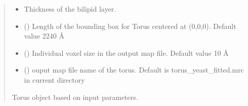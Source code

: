 \documentclass[letterpaper,10pt,english]{sphinxmanual}
\begin{document}
\begin{fulllineitems}
\begin{fulllineitems}
\begin{quote}
\begin{description}
\begin{itemize}
\item {} 
\sphinxAtStartPar
{} \textendash{} Thickness of the bilipid layer.

\item {} 
\sphinxAtStartPar
{} (\sphinxstyleliteralemphasis{\sphinxupquote{, }}) \textendash{} Length of the bounding box for Torus centered at (0,0,0). Default value 2240 Å

\item {} 
\sphinxAtStartPar
{} (\sphinxstyleliteralemphasis{\sphinxupquote{, }}) \textendash{} Individual voxel size in the output map file. Default value 10 Å

\item {} 
\sphinxAtStartPar
{} (\sphinxstyleliteralemphasis{\sphinxupquote{, }}) \textendash{} ouput map file name of the torus. Default is torus\_yeast\_fitted.mrc in current directory

\end{itemize}

\sphinxAtStartPar
Torus object based on input parameters.

\sphinxAtStartPar
{\hyperref[\detokenize{src:src.Torus.Torus}]{}}

\end{description}\end{quote}

\end{fulllineitems}


\begin{fulllineitems}
\label{\detokenize{src:src.BagelFitter.BagelFitter.load_exprimental_map}}
\pysigstartsignatures
{}
\pysigstopsignatures
\end{fulllineitems}


\end{fulllineitems}
\end{document}

